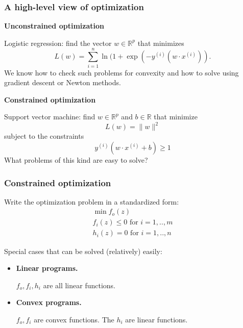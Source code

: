 \documentclass[smaller,handout]{beamer}
\def\R{{\mathbb R}}
\def\darkred{\color{red!70!black}}
\def\darkgreen{\color{green!60!black}}
\def\v2{{\vskip.2in}}
\def\R{{\mathbb R}}
\begin{document}
\begin{frame}
\frametitle{A high-level view of optimization}

\alert{\bf Unconstrained optimization}

Logistic regression: find the vector $w \in \R^p$ that minimizes
$$ L(w) = \sum_{i=1}^n \ln (1 + \exp(- y^{(i)} (w \cdot x^{(i)})) .$$
{\darkgreen We know how to check such problems for convexity and how to solve using gradient descent or Newton methods.}

\pause\v2
\alert{\bf Constrained optimization}

Support vector machine: find $w \in \R^p$ and $b \in \R$ that minimize
$$ L(w) = \|w\|^2$$
subject to the constraints
$$ y^{(i)} (w \cdot x^{(i)} + b) \geq 1 $$
{\darkgreen What problems of this kind are easy to solve?}

\end{frame}

\begin{frame}
\frametitle{Constrained optimization}

{\darkred Write the optimization problem in a standardized form:
\begin{gather*}
\min f_o(z) \\
f_i(z) \leq 0 \mbox{\ \ for $i=1,..,m$} \\
h_i(z) = 0    \mbox{\ \ for $i=1,..,n$}
\end{gather*}}

Special cases that can be solved (relatively) easily:
\begin{itemize}
\item {\bf Linear programs.}

{\darkgreen $f_o, f_i, h_i$ are all linear functions.}

\item {\bf Convex programs.}

{\darkgreen $f_o, f_i$ are convex functions. The $h_i$ are linear functions.}

\end{itemize}

\end{frame}
\end{document}
